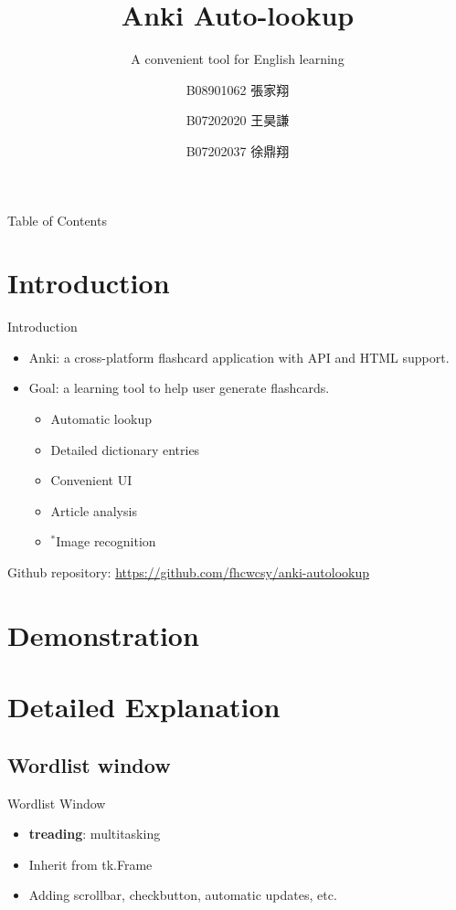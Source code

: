 \documentclass{beamer}
\title{Anki Auto-lookup}
\subtitle{A convenient tool for English learning}
\author[張家翔, 王昊謙, 徐鼎翔]
{B08901062 張家翔\inst{1} \and 
B07202020 王昊謙\inst{2} \and 
B07202037 徐鼎翔 \inst{2}}
\institute[NTU] %
{
	\inst{1}%
	Department of Electrical Engineering\\
	National Taiwan University
	\and
	\inst{2}%
	Department of Physics\\
	National Taiwan University
}
\begin{document}
\frame{\titlepage} 

\begin{frame}{Table of Contents}
	\tableofcontents
\end{frame}

\section{Introduction}%

\begin{frame}{Introduction}
	\begin{itemize}
		\item Anki: a cross-platform flashcard application with API and HTML support.
		\item Goal: a learning tool to help user generate flashcards.
			\begin{itemize}
				\item Automatic lookup
				\item Detailed dictionary entries
				\item Convenient UI
				\item Article analysis
				\item $^*$Image recognition
			\end{itemize}
	\end{itemize}
	Github repository: \url{https://github.com/fhcwcsy/anki-autolookup} 
\end{frame}
\section{Demonstration}%



\section{Detailed Explanation}%

\subsection{Wordlist window}%

\begin{frame}{Wordlist Window}
	\begin{itemize}
		\item \textbf{treading}: multitasking
		\item Inherit from tk.Frame
		\item Adding scrollbar, checkbutton, automatic updates, etc.
	\end{itemize}
\end{frame}
\end{document}
